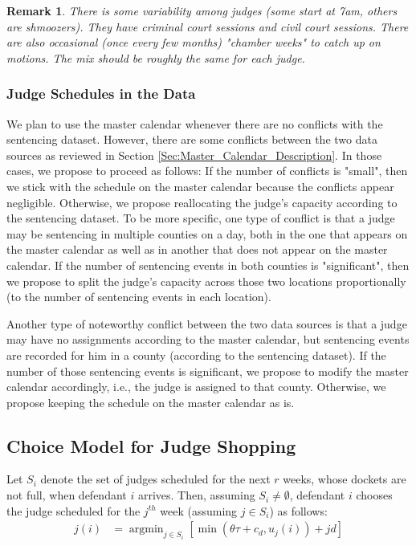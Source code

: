 \documentclass[11pt, oneside]{article}   	%
\theoremstyle{ModifiedStyle}
\newtheorem{remark}{Remark}
\DeclareMathOperator*{\argmin}{argmin}
\begin{document}
			\begin{remark}
				There is some variability among judges (some start at 7am, others are shmoozers). They have criminal court sessions and civil court sessions. There are also occasional (once every few months) "chamber weeks" to catch up on motions. The mix should be roughly the same for each judge.
			\end{remark}

		\subsubsection{Judge Schedules in the Data}
			We plan to use the master calendar whenever there are no conflicts with the sentencing dataset. However, there are some conflicts between the two data sources as reviewed in Section \ref{Sec:Master_Calendar_Description}. In those cases, we propose to proceed as follows: If the number of conflicts is "small", then we stick with the schedule on the master calendar because the conflicts appear negligible. Otherwise, we propose reallocating the judge's capacity according to the sentencing dataset. To be more specific, one type of conflict is that a judge may be sentencing in multiple counties on a day, both in the one that appears on the master calendar as well as in another that does not appear on the master calendar. If the number of sentencing events in both counties is "significant", then we propose to split the judge's capacity across those two locations proportionally (to the number of sentencing events in each location).

			Another type of noteworthy conflict between the two data sources is that a judge may have no assignments according to the master calendar, but sentencing events are recorded for him in a county (according to the sentencing dataset). If the number of those sentencing events is significant, we propose to modify the master calendar accordingly, i.e., the judge is assigned to that county. Otherwise, we propose keeping the schedule on the master calendar as is.

		\subsection{Choice Model for Judge Shopping}
			Let $S_i$ denote the set of judges scheduled for the next $r$ weeks, whose dockets are not full, when defendant $i$ arrives. Then, assuming $S_i \neq \emptyset$, defendant $i$ chooses the judge scheduled for the $j^{th}$ week (assuming $j \in S_i$) as follows:
			\begin{align*}
					j(i) &= \argmin_{j \in S_i} [\min(\theta \tau + c_d,u_j(i)) + jd]
			\end{align*}
\end{document}
